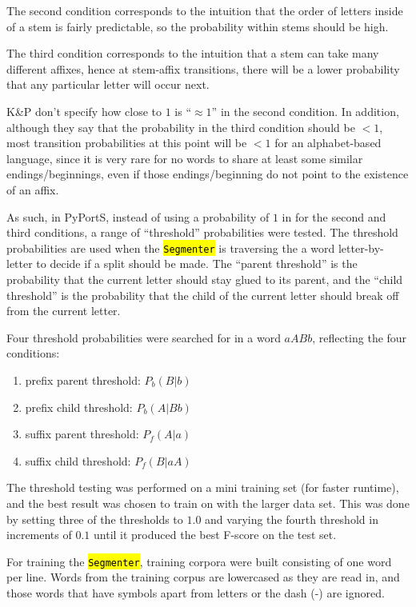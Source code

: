 \documentclass[paper=a4, fontsize=11pt]{article}
\newcommand{\hlc}[1]{\texttt{\hl{#1}}}
\begin{document}
The second condition corresponds to the intuition that the order of letters inside of a stem is fairly predictable, so the probability within stems should be high. 

The third condition corresponds to the intuition that a stem can take many different affixes, hence at stem-affix transitions, there will be a lower probability that any particular letter will occur next.

K\&P don't specify how close to $1$ is ``$\approx1$'' in the second condition. In addition, although they say that the probability in the third condition should be $<1$, most transition probabilities at this point will be $<1$ for an alphabet-based language, since it is very rare for no words to share at least some similar endings/beginnings, even if those endings/beginning do not point to the existence of an affix. 

As such, in PyPortS, instead of using a probability of $1$ in for the second and third conditions, a range of ``threshold'' probabilities were tested. The threshold probabilities are used when the \hlc{Segmenter} is traversing the a word letter-by-letter to decide if a split should be made. The ``parent threshold'' is the probability that the current letter should stay glued to its parent, and the ``child threshold'' is the probability that the child of the current letter should break off from the current letter.

Four threshold probabilities were searched for in a word $aABb$, reflecting the four conditions: 

\begin{enumerate}
    \item{prefix parent threshold: $P_b(B|b)$}
    \item{prefix child threshold: $P_b(A|Bb)$} 
    \item{suffix parent threshold: $P_f(A|a)$}
    \item{suffix child threshold: $P_f(B|aA)$}
\end{enumerate}

The threshold testing was performed on a mini training set (for faster runtime), and the best result was chosen to train on with the larger data set. This was done by setting three of the thresholds to $1.0$ and varying the fourth threshold in increments of $0.1$ until it produced the best F-score on the test set.  

For training the \hlc{Segmenter}, training corpora were built consisting of one word per line. Words from the training corpus are lowercased as they are read in, and those words that have symbols apart from letters or the dash (-) are ignored. 
\end{document}

